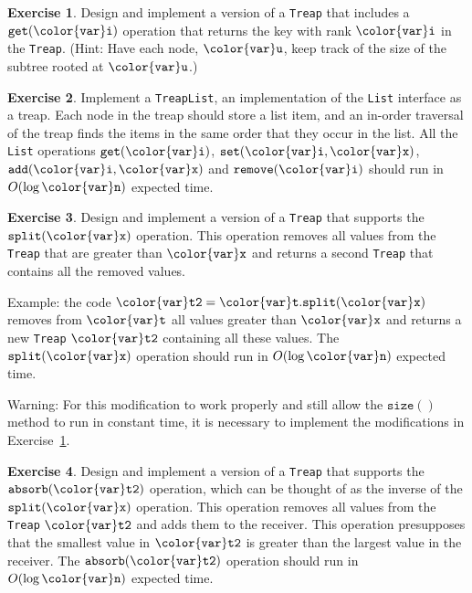 \documentclass[10pt]{book}
\theoremstyle{plain}
\theoremstyle{definition}
\newtheorem{exc}{Exercise}[chapter]
\newcommand{\exclabel}[1]{\label{exc:#1}}
\newcommand{\excref}[1]{Exercise~\ref{exc:#1}}
\begin{document}
\begin{exc}\exclabel{treap-get}
  Design and implement a version of a \texttt{Treap} that includes a \ensuremath{\mathtt{get({\color{var}i})}}
  operation that returns the key with rank \ensuremath{\mathtt{{\color{var}i}}} in the \texttt{Treap}.  (Hint:
  Have each node, \ensuremath{\mathtt{{\color{var}u}}}, keep track of the size of the subtree rooted
  at \ensuremath{\mathtt{{\color{var}u}}}.)
\end{exc}

\begin{exc}
  Implement a \texttt{TreapList}, an implementation of the \texttt{List} interface
  as a treap.  Each node in the treap should store a list item, and an
  in-order traversal of the treap finds the items in the same order that
  they occur in the list.  All the \texttt{List} operations \ensuremath{\mathtt{get({\color{var}i})}}, \ensuremath{\mathtt{set({\color{var}i},{\color{var}x})}},
  \ensuremath{\mathtt{add({\color{var}i},{\color{var}x})}} and \ensuremath{\mathtt{remove({\color{var}i})}} should run in $O(\log \ensuremath{\mathtt{{\color{var}n}}})$ expected time.
\end{exc}



\begin{exc}\exclabel{treap-split}
  Design and implement a version of a \texttt{Treap} that supports the \ensuremath{\mathtt{split({\color{var}x})}}
  operation.  This operation removes all values from the \texttt{Treap} that
  are greater than \ensuremath{\mathtt{{\color{var}x}}} and returns a second \texttt{Treap} that contains all
  the removed values.

  \noindent Example: the code \ensuremath{\mathtt{{\color{var}t2} = {\color{var}t}.split({\color{var}x})}} removes from \ensuremath{\mathtt{{\color{var}t}}} all values
  greater than \ensuremath{\mathtt{{\color{var}x}}} and returns a new \texttt{Treap} \ensuremath{\mathtt{{\color{var}t2}}} containing all
  these values. The \ensuremath{\mathtt{split({\color{var}x})}} operation should run in $O(\log \ensuremath{\mathtt{{\color{var}n}}})$
  expected time.

  \noindent Warning: For this modification to work properly and still allow the
  \ensuremath{\mathtt{size()}} method to run in constant time, it is necessary to implement
  the modifications in \excref{treap-get}.
\end{exc}

\begin{exc}\exclabel{treap-join}
  Design and implement a version of a \texttt{Treap} that supports the
  \ensuremath{\mathtt{absorb({\color{var}t2})}} operation, which can be thought of as the inverse of
  the \ensuremath{\mathtt{split({\color{var}x})}} operation.  This operation removes all values from the
  \texttt{Treap} \ensuremath{\mathtt{{\color{var}t2}}} and adds them to the receiver.  This operation presupposes
  that the smallest value in \ensuremath{\mathtt{{\color{var}t2}}} is greater than the largest value in
  the receiver.  The \ensuremath{\mathtt{absorb({\color{var}t2})}} operation should run in $O(\log \ensuremath{\mathtt{{\color{var}n}}})$
  expected time.
\end{exc}
\end{document}
